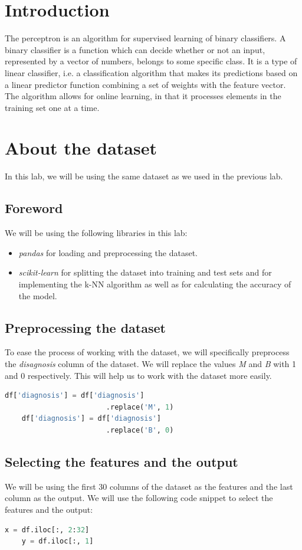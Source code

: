 \section{Introduction}
The perceptron is an algorithm for supervised learning of binary classifiers. A binary classifier is a function which can decide whether or not an input, represented by a vector of numbers, belongs to some specific class. It is a type of linear classifier, i.e. a classification algorithm that makes its predictions based on a linear predictor function combining a set of weights with the feature vector. The algorithm allows for online learning, in that it processes elements in the training set one at a time.\\

\section{About the dataset}
In this lab, we will be using the same dataset as we used in the previous lab.\\
\subsection{Foreword}
We will be using the following libraries in this lab:
\begin{itemize}
    \item \textit{pandas} for loading and preprocessing the dataset.
    \item \textit{scikit-learn} for splitting the dataset into training and test sets and for implementing the k-NN algorithm as well as for calculating the accuracy of the model.
\end{itemize}
\subsection{Preprocessing the dataset}
To ease the process of working with the dataset, we will specifically preprocess the \textit{disagnosis} column of the dataset. We will replace the values \textit{M} and \textit{B} with 1 and 0 respectively. This will help us to work with the dataset more easily.
\begin{lstlisting}[language=Python]
    df['diagnosis'] = df['diagnosis']
                        .replace('M', 1)
    df['diagnosis'] = df['diagnosis']
                        .replace('B', 0)
\end{lstlisting}
\subsection{Selecting the features and the output}
We will be using the first 30 columns of the dataset as the features and the last column as the output. We will use the following code snippet to select the features and the output:
\begin{lstlisting}[language=Python]
    x = df.iloc[:, 2:32]
    y = df.iloc[:, 1]
\end{lstlisting}
